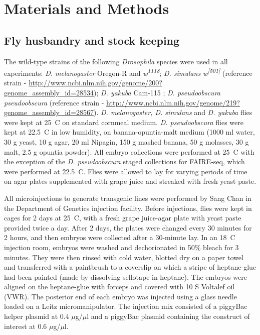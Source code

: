 \chapter{Materials and Methods}


\section{Fly husbandry and stock keeping}
The wild-type strains of the following \emph{Drosophila} species were used in all experiments: \emph{D. melanogaster} Oregon-R and \emph{w\textsuperscript{1118}}; \emph{D. simulans w\textsuperscript{[501]}} (reference strain - \url{http://www.ncbi.nlm.nih.gov/genome/200?genome_assembly_id=28534}); \emph{D. yakuba} Cam-115 \citep{coyne_genetic_2004}; \emph{D. pseudoobscura pseudoobscura} (reference strain - \url{http://www.ncbi.nlm.nih.gov/genome/219?genome_assembly_id=28567}). \emph{D. melanogaster, D. simulans} and \emph{D. yakuba} flies were kept at 25\degree~C on standard cornmeal medium. \emph{D. pseudoobscura} flies were kept at 22.5\degree~C in low humidity, on banana-opuntia-malt medium (1000 ml water, 30 g yeast, 10 g agar, 20 ml Nipagin, 150 g mashed banana, 50 g molasses, 30 g malt, 2.5 g opuntia powder). All embryo collections were performed at 25\degree~C with the exception of the \emph{D. pseudoobscura} staged collections for FAIRE-seq, which were performed at 22.5\degree~C. Flies were allowed to lay for varying periods of time on agar plates supplemented with grape juice and streaked with fresh yeast paste.

All microinjections to generate transgenic lines were performed by Sang Chan in the Department of Genetics injection facility. Before injections, flies were kept in cages for 2 days at 25\degree~C, with a fresh grape juice-agar plate with yeast paste provided twice a day. After 2 days, the plates were changed every 30 minutes for 2 hours, and then embryos were collected after a 30-minute lay. In an 18\degree~C injection room, embryos were washed and dechorionated in 50\% bleach for 3 minutes. They were then rinsed with cold water, blotted dry on a paper towel and transferred with a paintbrush to a coverslip on which a stripe of heptane-glue had been painted (made by dissolving sellotape in heptane). The embryos were aligned on the heptane-glue with forceps and covered with 10 S Voltalef oil (VWR). The posterior end of each embryo was injected using a glass needle loaded on a Leitz micromanipulator. The injection mix consisted of a piggyBac helper plasmid at 0.4 \(\mu\)g/\(\mu\)l and a piggyBac plasmid containing the construct of interest at 0.6 \(\mu\)g/\(\mu\)l.

